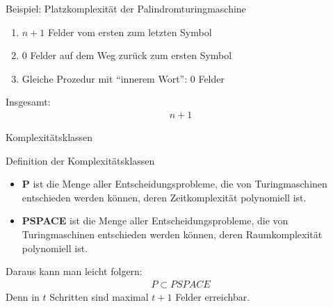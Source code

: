 \begin{frame}{Beispiel: Platzkomplexität der Palindromturingmaschine}
    \begin{enumerate}
        \item $n + 1$ Felder vom ersten zum letzten Symbol
        \item $0$ Felder auf dem Weg zurück zum ersten Symbol
        \item Gleiche Prozedur mit ``innerem Wort'': $0$ Felder
    \end{enumerate}
    Insgesamt:
    \begin{align*}
        n+1
    \end{align*}
\end{frame}


\begin{frame}{Komplexitätsklassen}
    \begin{block}{Definition der Komplexitätsklassen}
        \begin{itemize}
            \item \textbf{P} ist die Menge aller Entscheidungsprobleme, die von Turingmaschinen entschieden werden können, deren Zeitkomplexität polynomiell ist.
            \item \textbf{PSPACE} ist die Menge aller Entscheidungsprobleme, die von Turingmaschinen entschieden werden können, deren Raumkomplexität polynomiell ist.
        \end{itemize}
        Daraus kann man leicht folgern:
        \begin{align*}
            P \subset PSPACE
        \end{align*}
        Denn in $t$ Schritten sind maximal $t+1$ Felder erreichbar.
    \end{block}
\end{frame}

